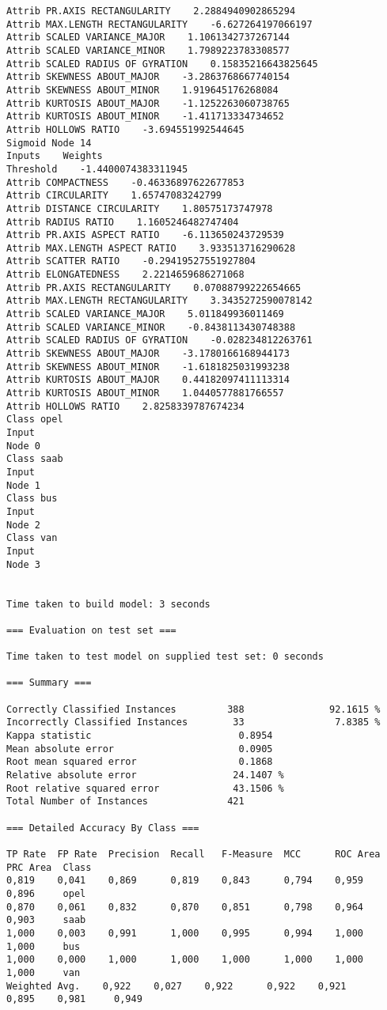 \documentclass[
	article,			%
	11pt,				%
	oneside,			%
	a4paper,			%
	english,			%
	brazil,				%
	sumario=tradicional
	]{abntex2}
\begin{document}
\begin{lstlisting}
Attrib PR.AXIS RECTANGULARITY    2.2884940902865294
Attrib MAX.LENGTH RECTANGULARITY    -6.627264197066197
Attrib SCALED VARIANCE_MAJOR    1.1061342737267144
Attrib SCALED VARIANCE_MINOR    1.7989223783308577
Attrib SCALED RADIUS OF GYRATION    0.15835216643825645
Attrib SKEWNESS ABOUT_MAJOR    -3.2863768667740154
Attrib SKEWNESS ABOUT_MINOR    1.919645176268084
Attrib KURTOSIS ABOUT_MAJOR    -1.1252263060738765
Attrib KURTOSIS ABOUT_MINOR    -1.411713334734652
Attrib HOLLOWS RATIO    -3.694551992544645
Sigmoid Node 14
Inputs    Weights
Threshold    -1.4400074383311945
Attrib COMPACTNESS    -0.46336897622677853
Attrib CIRCULARITY    1.65747083242799
Attrib DISTANCE CIRCULARITY    1.80575173747978
Attrib RADIUS RATIO    1.1605246482747404
Attrib PR.AXIS ASPECT RATIO    -6.113650243729539
Attrib MAX.LENGTH ASPECT RATIO    3.933513716290628
Attrib SCATTER RATIO    -0.29419527551927804
Attrib ELONGATEDNESS    2.2214659686271068
Attrib PR.AXIS RECTANGULARITY    0.07088799222654665
Attrib MAX.LENGTH RECTANGULARITY    3.3435272590078142
Attrib SCALED VARIANCE_MAJOR    5.011849936011469
Attrib SCALED VARIANCE_MINOR    -0.8438113430748388
Attrib SCALED RADIUS OF GYRATION    -0.028234812263761
Attrib SKEWNESS ABOUT_MAJOR    -3.1780166168944173
Attrib SKEWNESS ABOUT_MINOR    -1.6181825031993238
Attrib KURTOSIS ABOUT_MAJOR    0.44182097411113314
Attrib KURTOSIS ABOUT_MINOR    1.0440577881766557
Attrib HOLLOWS RATIO    2.8258339787674234
Class opel
Input
Node 0
Class saab
Input
Node 1
Class bus
Input
Node 2
Class van
Input
Node 3


Time taken to build model: 3 seconds

=== Evaluation on test set ===

Time taken to test model on supplied test set: 0 seconds

=== Summary ===

Correctly Classified Instances         388               92.1615 %
Incorrectly Classified Instances        33                7.8385 %
Kappa statistic                          0.8954
Mean absolute error                      0.0905
Root mean squared error                  0.1868
Relative absolute error                 24.1407 %
Root relative squared error             43.1506 %
Total Number of Instances              421     

=== Detailed Accuracy By Class ===

TP Rate  FP Rate  Precision  Recall   F-Measure  MCC      ROC Area  PRC Area  Class
0,819    0,041    0,869      0,819    0,843      0,794    0,959     0,896     opel
0,870    0,061    0,832      0,870    0,851      0,798    0,964     0,903     saab
1,000    0,003    0,991      1,000    0,995      0,994    1,000     1,000     bus
1,000    0,000    1,000      1,000    1,000      1,000    1,000     1,000     van
Weighted Avg.    0,922    0,027    0,922      0,922    0,921      0,895    0,981     0,949     


\end{lstlisting}
\end{document}
